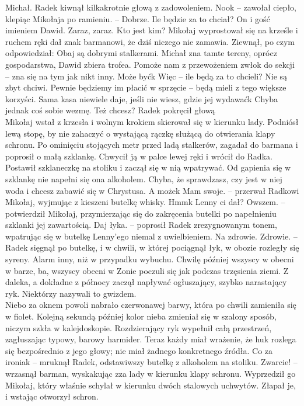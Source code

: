 \documentclass[../MAIN.tex]{subfiles}
\begin{document}
\xx Michał.
\qd
Radek kiwnął kilkakrotnie głową z zadowoleniem.
\sx Noo\3k -- zawołał ciepło, klepiąc Mikołaja po ramieniu. -- Dobrze. Ile będzie za to chciał?
\xx On i gość imieniem Dawid.
\xx Zaraz, zaraz. Kto jest kim?
\qd
Mikołaj wyprostował się na krześle i ruchem ręki dał znak barmanowi, że dziś niczego nie zamawia. Ziewnął, po czym odpowiedział:
\sx Obaj są dobrymi stalkerami. Michał zna tamte tereny, oprócz gospodarstwa, Dawid zbiera trofea. Pomoże nam z przewożeniem zwłok do sekcji -- zna się na tym jak nikt inny.
\xx Może być\3k Więc -- ile będą za to chcieli?
\xx Nie są zbyt chciwi. Pewnie będziemy im płacić w sprzęcie -- będą mieli z tego większe korzyści. Sama kasa niewiele daje, jeśli nie wiesz, gdzie jej wydawać\3k Chyba jednak coś sobie wezmę. Też chcesz?
\qd
Radek pokręcił głową\\
Mikołaj wstał z krzesła i wolnym krokiem skierował się w kierunku lady. Podniósł lewą stopę, by nie zahaczyć o wystającą rączkę służącą do otwierania klapy schronu. Po ominięciu stojących metr przed ladą stalkerów, zagadał do barmana i poprosił o małą szklankę. Chwycił ją w palce lewej ręki i wrócił do Radka. Postawił szklaneczkę na stoliku i zaczął się w nią wpatrywać.
\sx Od gapienia się w szklankę nie napełni się ona alkoholem. Chyba, że sprawdzasz, czy jest w niej woda i chcesz zabawić się w Chrystusa. A może\3k
\xx Mam swoje. -- przerwał Radkowi Mikołaj, wyjmując z kieszeni butelkę whisky.
\xx Hmm\3k Lenny ci dał?
\xx Owszem. -- potwierdził Mikołaj, przymierzając się do zakręcenia butelki po napełnieniu szklanki jej zawartością.
\xx Daj łyka. -- poprosił Radek zrezygnowanym tonem, wpatrując się w butelkę Lenny’ego niemal z uwielbieniem.
\xx Na zdrowie.
\xx Zdrowie. -- Radek sięgnął po butelkę, i w chwili, w której pociągnął łyk, w obozie rozległy się syreny.
\qd
Alarm inny, niż w przypadku wybuchu. Chwilę później wszyscy w obecni w barze, ba, wszyscy obecni w Zonie poczuli się jak podczas trzęsienia ziemi. Z daleka, a dokładne z północy zaczął napływać ogłuszający, szybko narastający ryk. Niektórzy nazywali to gwizdem.\\
Niebo za oknem powoli nabrało czerwonawej barwy, która po chwili zamieniła się w fiolet. Kolejną sekundą później kolor nieba zmieniał się w szalony sposób, niczym szkła w kalejdoskopie. Rozdzierający ryk wypełnił całą przestrzeń, zagłuszając typowy, barowy harmider. Teraz każdy miał wrażenie, że huk rozlega się bezpośrednio z jego głowy; nie miał żadnego konkretnego źródła.
\sx Co za ironia\3k -- mruknął Radek, odstawiwszy butelkę z alkoholem na stoliku.
\xx Zwarcie! -- wrzasnął barman, wyskakując zza lady w kierunku klapy schronu. 
\qd
Wyprzedził go Mikołaj, który właśnie schylał w kierunku dwóch stalowych uchwytów. Złapał je, i wstając otworzył schron.
\end{document}
